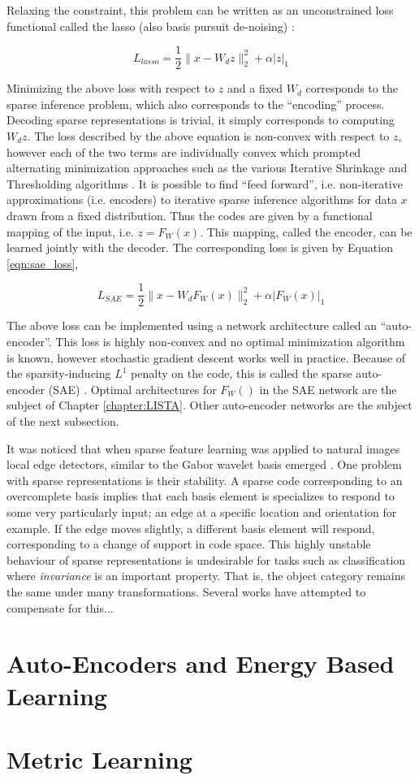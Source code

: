 Relaxing the constraint, this problem can be written as an unconstrained loss
functional called the lasso (also basis pursuit de-noising) \cite{BP}:  

\begin{equation} 
L_{lasso} = \frac{1}{2}\|x-W_dz\|^2_2 + \alpha |z|_1
\label{eqn:lasso} 
\end{equation} 

Minimizing the above loss with respect to $z$ and a fixed $W_d$ corresponds to
the sparse inference problem, which also corresponds to the ``encoding''
process. Decoding sparse representations is trivial, it simply corresponds to
computing $W_dz$.  The loss described by the above equation is non-convex with
respect to $z$, however each of the two terms are individually convex which
prompted alternating minimization approaches such as the various Iterative
Shrinkage and Thresholding algorithms \cite{FISTA}. It is possible to find
``feed forward'', i.e. non-iterative approximations (i.e. encoders) to
iterative sparse inference algorithms for data $x$ drawn from a fixed
distribution. Thus the codes are given by a functional mapping of the input,
i.e. $z=F_W(x)$. This mapping, called the encoder, can be learned jointly with
the decoder.  The corresponding loss is given by Equation \ref{eqn:sae_loss}, 

\begin{equation} 
L_{SAE} = \frac{1}{2}\|x-W_dF_W(x)\|^2_2 + \alpha |F_W(x)|_1
\label{eqn:sae_loss} 
\end{equation} 

The above loss can be implemented using a network architecture called an
``auto-encoder''. This loss is highly non-convex and no optimal minimization
algorithm is known, however stochastic gradient descent works well in practice.
Because of the sparsity-inducing $L^1$ penalty on the code, this is called the
sparse auto-encoder (SAE) \cite{SAE1,SAE2}. Optimal architectures for $F_W()$
in the SAE network are the subject of Chapter \ref{chapter:LISTA}. Other
auto-encoder networks are the subject of the next subsection.    

It was noticed that when sparse feature learning was applied to natural images
local edge detectors, similar to the Gabor wavelet basis emerged \cite{SC,gabor}.  
One problem with sparse representations is their stability. A sparse code 
corresponding to an overcomplete basis implies that each basis element is specializes to
respond to some very particularly input; an edge at a specific location and orientation
for example. If the edge moves slightly, a different basis element will respond, corresponding 
to a change of support in code space. This highly unstable behaviour of sparse 
representations is undesirable for tasks such as classification where \emph{invariance} 
is an important property. That is, the object category remains the same under 
many transformations. Several works have attempted to compensate for this...    
 

\section{Auto-Encoders and Energy Based Learning} 

\section{Metric Learning}

 
